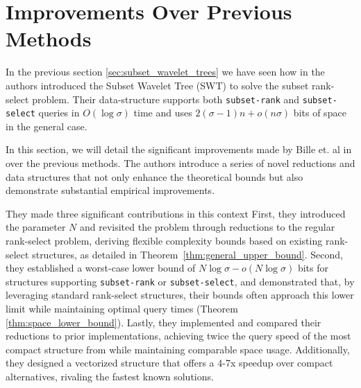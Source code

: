 \clearpage
\section{Improvements Over Previous Methods} \label{sec:degenerate_string_better}

In the previous section \ref{sec:subset_wavelet_trees} we have seen how in \cite{SubsetWT} the authors introduced the Subset Wavelet Tree (SWT) to solve the subset rank-select problem. Their data-structure supports both \texttt{subset-rank} and \texttt{subset-select} queries in $O(\log \sigma)$ time and uses $2 (\sigma - 1)n + o(n\sigma)$ bits of space in the general case. \vspace{1em}

\noindent In this section, we will detail the significant improvements made by Bille et. al in \cite{bille2023rank} over the previous methods. The authors introduce a series of novel reductions and data structures that not only enhance the theoretical bounds but also demonstrate substantial empirical improvements. \vspace{1em}

\noindent They made three significant contributions in this context First, they introduced the parameter $N$ and revisited the problem through reductions to the regular rank-select problem, deriving flexible complexity bounds based on existing rank-select structures, as detailed in Theorem~\ref{thm:general_upper_bound}. Second, they established a worst-case lower bound of $N\log \sigma - o(N\log \sigma)$ bits for structures supporting \texttt{subset-rank} or \texttt{subset-select}, and demonstrated that, by leveraging standard rank-select structures, their bounds often approach this lower limit while maintaining optimal query times (Theorem \ref{thm:space_lower_bound}). Lastly, they implemented and compared their reductions to prior implementations, achieving twice the query speed of the most compact structure from \cite{SubsetWT} while maintaining comparable space usage. Additionally, they designed a vectorized structure that offers a 4-7x speedup over compact alternatives, rivaling the fastest known solutions.



